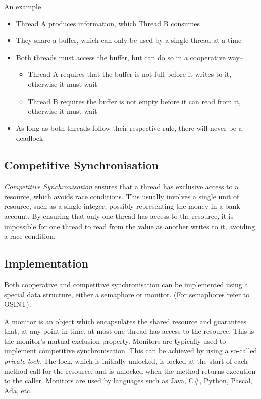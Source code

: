 An example
\begin{itemize}
  \item Thread A produces information, which Thread B consumes
  \item They share a buffer, which can only be used by a single thread at a time
  \item Both threads must access the buffer, but can do so in a cooperative way--
  \begin{itemize}
    \item Thread A requires that the buffer is not full before it writes to it, otherwise it must wait
    \item Thread B requires the buffer is not empty before it can read from it, otherwise it must wait
  \end{itemize}
  \item As long as both threads follow their respective rule, there will never be a deadlock
\end{itemize}

\subsection*{Competitive Synchronisation}

\textit{Competitive Synchronisation} ensures that a thread has exclusive access to a resource, which avoids race
 conditions. This usually involves a single unit of resource, such as a single integer, possibly representing the money
 in a bank account. By ensuring that only one thread has access to the resource, it is impossible for one thread to read
 from the value as another writes to it, avoiding a race condition.

\subsection*{Implementation}

Both cooperative and competitive synchronisation can be implemented using a special data structure, either a semaphore
 or monitor. (For semaphores refer to OSINT).

A monitor is an object which encapsulates the shared resource and guarantees that, at any point in time, at most one
 thread has access to the resource. This is the monitor's mutual exclusion property. Monitors are typically used to
 implement competitive synchronisation. This can be achieved by using a so-called \textit{private lock}. The lock, which
 is initially unlocked, is locked at the start of each method call for the resource, and is unlocked when the method
 returns execution to the caller. Monitors are used by languages such as Java, C\#, Python, Pascal, Ada, etc.